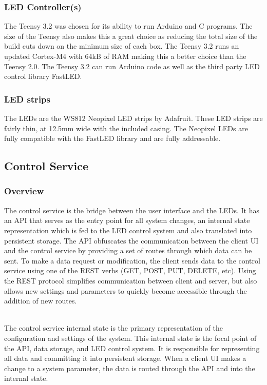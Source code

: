 			\subsubsection{LED Controller(s)}
			\noindent The Teensy 3.2 was chosen for its ability to run Arduino and C programs.
			The size of the Teensy also makes this a great choice as reducing the
			total size of the build cuts down on the minimum size of each box.
			The Teensy 3.2 runs an updated Cortex-M4 with 64kB of RAM making this a
			better choice than the Teensy 2.0.\cite{atmel} The Teensy 3.2 can run Arduino code as well as the third party LED control library FastLED.

			\subsubsection{LED strips}
			\noindent The LEDs are the WS812 Neopixel LED strips by Adafruit. These LED
			strips are fairly thin, at 12.5mm wide with the included casing. The
			Neopixel LEDs are fully compatible with the FastLED library and are fully addressable.\cite{neo}

		\subsection{Control Service}
			\subsubsection{Overview}
			The control service is the bridge between the user interface and the LEDs.
			It has an API that serves as the entry point for all system changes, an internal state representation which is fed to the LED control system and also translated into persistent storage.
			The API obfuscates the communication between the client UI and the control service by providing a set of routes through which data can be sent.
			To make a data request or modification, the client sends data to the control service using one of the REST verbs (GET, POST, PUT, DELETE, etc).
			Using the REST protocol simplifies communication between client and server, but also allows new settings and parameters to quickly become accessible through the addition of new routes.

			\noindent \\The control service internal state is the primary representation of the configuration and settings of the system.
			This internal state is the focal point of the API, data storage, and LED control system.
			It is responsible for representing all data and committing it into persistent storage.
			When a client UI makes a change to a system parameter, the data is routed through the API and into the internal state.

